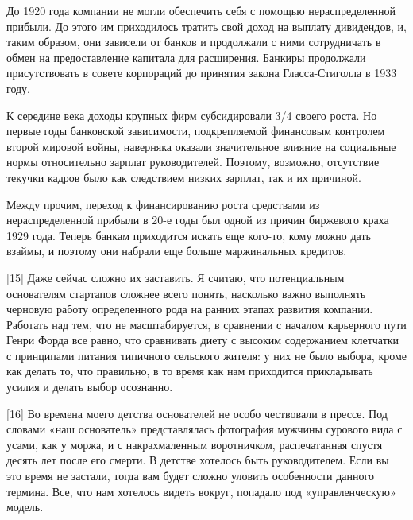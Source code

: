 \documentclass[ebook,12pt,oneside,openany]{memoir}
\begin{document}
До 1920 года компании не могли обеспечить себя с помощью
нераспределенной прибыли. До этого им приходилось тратить свой доход
на выплату дивидендов, и, таким образом, они зависели от банков и
продолжали с ними сотрудничать в обмен на предоставление капитала для
расширения. Банкиры продолжали присутствовать в совете корпораций до
принятия закона Гласса-Стиголла в 1933 году. \newline

К середине века доходы крупных фирм субсидировали 3/4 своего роста. Но
первые годы банковской зависимости, подкрепляемой финансовым контролем
второй мировой войны, наверняка оказали значительное влияние на
социальные нормы относительно зарплат руководителей. Поэтому,
возможно, отсутствие текучки кадров было как следствием низких
зарплат, так и их причиной. \newline

Между прочим, переход к финансированию роста средствами из
нераспределенной прибыли в 20-е годы был одной из причин биржевого
краха 1929 года. Теперь банкам приходится искать еще кого-то, кому
можно дать взаймы, и поэтому они набрали еще больше маржинальных
кредитов. \newline

[15] Даже сейчас сложно их заставить. Я считаю, что потенциальным
основателям стартапов сложнее всего понять, насколько важно выполнять
черновую работу определенного рода на ранних этапах развития компании.
Работать над тем, что не масштабируется, в сравнении с началом
карьерного пути Генри Форда все равно, что сравнивать диету с высоким
содержанием клетчатки с принципами питания типичного сельского жителя:
у них не было выбора, кроме как делать то, что правильно, в то время
как нам приходится прикладывать усилия и делать выбор осознанно. \newline

[16] Во времена моего детства основателей не особо чествовали в
прессе. Под словами «наш основатель» представлялась фотография мужчины
сурового вида с усами, как у моржа, и с накрахмаленным воротничком,
распечатанная спустя десять лет после его смерти. В детстве хотелось
быть руководителем. Если вы это время не застали, тогда вам будет
сложно уловить особенности данного термина. Все, что нам хотелось
видеть вокруг, попадало под «управленческую» модель. \newline
\end{document}
